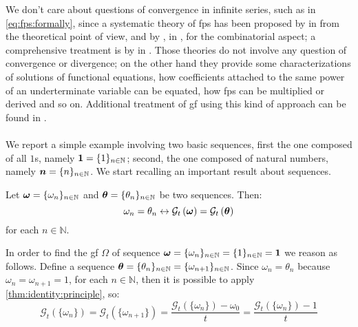 We don't care about questions of convergence in infinite series, such as in
 \autoref{eq:fps:formally},
since a systematic theory of \ac{fps} has been proposed by
\citeauthor{niven:1969} in \cite{niven:1969} from the theoretical point of
view, and by \citeauthor{riordan:1964}, in \cite{riordan:1964}, for the
combinatorial aspect; a comprehensive treatment is by
\citeauthor{Stanley:2011:ECV:2124415} in \cite{Stanley:2011:ECV:2124415} .
Those theories do not involve any question of convergence or divergence; on the
other hand they provide some characterizations of solutions of functional
equations, how coefficients attached to the same power of an underterminate
variable can be equated, how \ac{fps} can be multiplied or derived and so on.
Additional treatment of \ac{gf} using this kind of approach can be found in
\cite{Wilf:2006:GEN:1204575}.
\\\\
We report a simple example involving two basic sequences, first the one
composed of all $1$s, namely $\boldsymbol{1}=\lbrace1\rbrace_{n\in\mathbb{N}}$; second, the
one composed of natural numbers, namely $\boldsymbol{n}=\lbrace n\rbrace_{n\in\mathbb{N}}$.
We start recalling an important result about sequences.
\begin{theorem}
    Let $\boldsymbol{\omega}=\lbrace\omega_{n}\rbrace_{n\in\mathbb{N}}$ and 
        $\boldsymbol{\theta}=\lbrace\theta_{n}\rbrace_{n\in\mathbb{N}}$ be two sequences.
        Then:
    \begin{displaymath}
        \omega_{n}=\theta_{n}\leftrightarrow\mathcal{G}_{t}\left(\boldsymbol{\omega}\right)
            =\mathcal{G}_{t}\left(\boldsymbol{\theta}\right)
    \end{displaymath}
    \label{thm:identity:principle}
    for each $n\in\mathbb{N}$.
\end{theorem}
In order to find the \ac{gf} $\Omega$ of sequence
$\boldsymbol{\omega}=\lbrace\omega_{n}\rbrace_{n\in\mathbb{N}}
=\lbrace1\rbrace_{n\in\mathbb{N}}=\boldsymbol{1}$ we reason as follows.  Define a sequence
$\boldsymbol{\theta}=\lbrace\theta_{n}\rbrace_{n\in\mathbb{N}}=\lbrace\omega_{n+1}\rbrace_{n\in\mathbb{N}}$.
Since $\omega_{n}=\theta_{n}$ because $\omega_{n}=\omega_{n+1}=1$, for each
$n\in\mathbb{N}$, then it is possible to apply
\autoref{thm:identity:principle}, so:
\begin{displaymath}
    \mathcal{G}_{t}\left(\lbrace\omega_{n}\rbrace\right) 
        =\mathcal{G}_{t}\left(\lbrace\omega_{n+1}\rbrace\right)
        =\frac{\mathcal{G}_{t}\left(\lbrace\omega_{n}\rbrace\right)-\omega_{0}}{t}
        =\frac{\mathcal{G}_{t}\left(\lbrace\omega_{n}\rbrace\right)-1}{t}
\end{displaymath}
